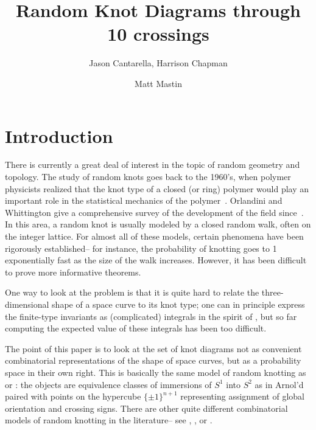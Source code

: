 \documentclass[amsmath,secnumarabic,floatfix,amssymb,nofootinbib,nobibnotes,letterpaper,11pt,tightenlines,showkeys]{revtex4}
\theoremstyle{definition}
\begin{document}
\title[]{Random Knot Diagrams through 10 crossings}
\author{Jason Cantarella, Harrison Chapman}
\noaffiliation
\author{Matt Mastin}
\noaffiliation

\maketitle

\section{Introduction}

There is currently a great deal of interest in the topic of random geometry and topology. The study of random knots goes back to the 1960's, when polymer physicists realized that the knot type of a closed (or ring) polymer would play an important role in the statistical mechanics of the polymer~\cite{Edwards:1967hd}. Orlandini and Whittington give a comprehensive survey of the development of the field since~\cite{Orlandini:2007kn}. In this area, a random knot is usually modeled by a closed random walk, often on the integer lattice. For almost all of these models, certain phenomena have been rigorously established-- for instance, the probability of knotting goes to 1 exponentially fast as the size of the walk increases. However, it has been difficult to prove more informative theorems. 

One way to look at the problem is that it is quite hard to relate the three-dimensional shape of a space curve to its knot type; one can in principle express the finite-type invariants as (complicated) integrals in the spirit of \cite{Lin:1994wq}, but so far computing the expected value of these integrals has been too difficult. 

The point of this paper is to look at the set of knot diagrams not as convenient combinatorial representations of the shape of space curves, but as a probability space in their own right. This is basically the same model of random knotting as \cite{Dunfield:mdWrGjny} or \cite{Diao:2005tp}: the objects are equivalence classes of immersions of $S^1$ into $S^2$ as in Arnol'd~\cite{Arnold:1994wr} paired with points on the hypercube $\{\pm 1\}^{n+1}$ representing assignment of global orientation and crossing signs. There are other quite different combinatorial models of random knotting in the literature-- see \cite{Cohen:2015wz}, \cite{EvenZohar:2014ws}, or \cite{Nechaev:1996gv}. 
\end{document}
